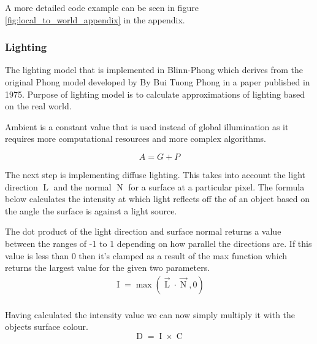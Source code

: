 \documentclass[11pt]{article}
\begin{document}
A more detailed code example can be seen in figure
\ref{fig:local_to_world_appendix} in the appendix.

\subsubsection{Lighting}

The lighting model that is implemented in Blinn-Phong which derives
from the original Phong model developed by By Bui Tuong Phong in a
paper published in 1975.  Purpose of lighting model is to calculate
approximations of lighting based on the real world.  \cite{blinn}

Ambient is a constant value that is used instead of global illumination
as it requires more computational resources and more complex algorithms.

\newcommand{\intensity}{\operatorname{I}}
\newcommand{\lightdir}{\operatorname{L}}
\newcommand{\normal}{\operatorname{N}}
\newcommand{\diffuse}{\operatorname{D}}
\newcommand{\glslcolor}{\operatorname{C}}
\newcommand{\glslmax}{\operatorname{max}}

\begin{equation}
	A = G + P
\end{equation}

The next step is implementing diffuse lighting. This takes into account
the light direction $\lightdir$ and the normal $\normal$ for a surface at a particular
pixel. The formula below calculates the intensity at which light reflects off the
of an object based on the angle the surface is against a light source. 

The dot product of the light direction and surface normal returns a value between
the ranges of -1 to 1 depending on how parallel the directions are. If this value
is less than 0 then it's clamped as a result of the max function which returns the largest value for the given two parameters.
\begin{gather}
	\intensity = \glslmax(\vec{\lightdir} \cdot \vec{\normal}, 0) \\
\end{gather}

Having calculated the intensity value we can now simply multiply it with the objects
surface colour.
\begin{equation}
	\diffuse = \intensity \times \glslcolor
\end{equation}
\end{document}
